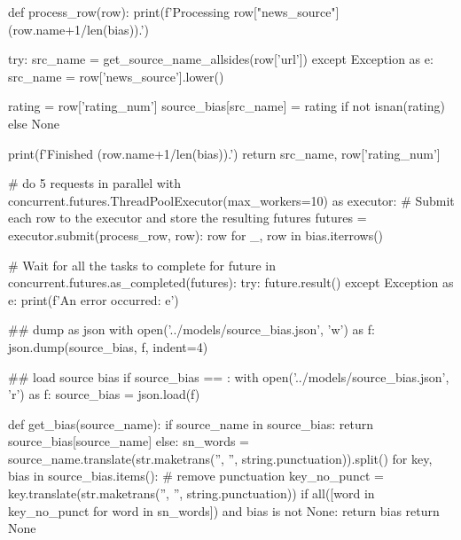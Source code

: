 \begin{pyin}
def process_row(row):
    print(f'Processing {row["news_source"]} ({row.name+1}/{len(bias)}).')

    try:
        src_name = get_source_name_allsides(row['url'])
    except Exception as e:
        src_name = row['news_source'].lower()

    rating = row['rating_num']
    source_bias[src_name] = rating if not isnan(rating) else None

    print(f'Finished ({row.name+1}/{len(bias)}).')
    return src_name, row['rating_num']

# do 5 requests in parallel
with concurrent.futures.ThreadPoolExecutor(max_workers=10) as executor:
    # Submit each row to the executor and store the resulting futures
    futures = {executor.submit(process_row, row): row for _, row in bias.iterrows()}

    # Wait for all the tasks to complete
    for future in concurrent.futures.as_completed(futures):
        try:
            future.result()
        except Exception as e:
            print(f'An error occurred: {e}')
\end{pyin}

\begin{pyin}
\## dump as json
with open('../models/source_bias.json', 'w') as f:
    json.dump(source_bias, f, indent=4)
\end{pyin}

\begin{pyin}
\## load source bias
if source_bias == {}:
    with open('../models/source_bias.json', 'r') as f:
        source_bias = json.load(f)
\end{pyin}

\begin{pyin}
def get_bias(source_name):
    if source_name in source_bias:
        return source_bias[source_name]
    else:
        sn_words = source_name.translate(str.maketrans('', '', string.punctuation)).split()
        for key, bias in source_bias.items():
            # remove punctuation
            key_no_punct = key.translate(str.maketrans('', '', string.punctuation))
            if all([word in key_no_punct for word in sn_words]) and bias is not None:
                return bias
        return None
\end{pyin}

